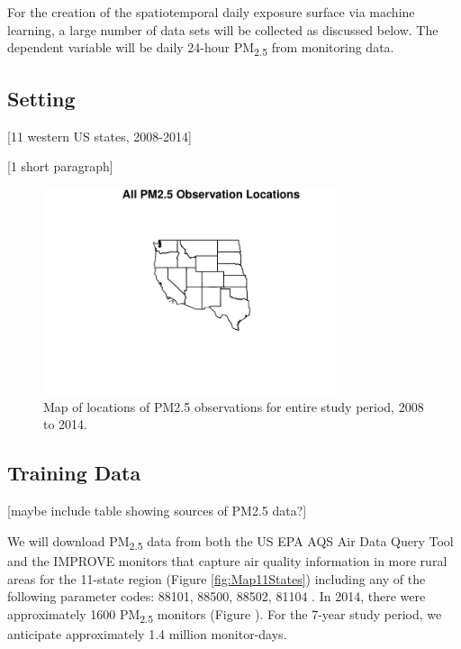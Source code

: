 \documentclass[authoryear]{elsarticle}
\begin{document}
For the creation of the spatiotemporal daily exposure surface via machine learning, a large number of data sets will be collected as discussed below. The dependent variable will be daily 24-hour PM\textsubscript{2.5} from monitoring data.  

\subsection{Setting} %
[11 western US states, 2008-2014]

[1 short paragraph]

\begin{figure} 
\centering 
\includegraphics[width=0.77\textwidth]{Code_Outputs/MapPM25_All_Sitesplot_year0.pdf} 
\caption{\label{fig:MapPM25Loc0}Map of locations of PM2.5 observations for entire study period, 2008 to 2014.} 
\end{figure} 


\subsection{Training Data} %
[maybe include table showing sources of PM2.5 data?]

We will download PM\textsubscript{2.5} data from both the US EPA AQS Air Data Query Tool 
\citep{EPAAirData2017} and the IMPROVE monitors that capture air quality information in 
more rural areas \citep{EPANPM25IMPROVE2017} for the 11-state region (Figure \ref{fig:Map11States}) including any of the following parameter codes: 88101, 88500, 88502, 81104 \citep{EPANPM25Memo2017,EPANPM25Parameters2017,EPANAllParameters2017}. In 2014, there were approximately 1600 PM\textsubscript{2.5} monitors (Figure %
). For the 7-year study period, we anticipate approximately 1.4 million monitor-days. 
\end{document}
